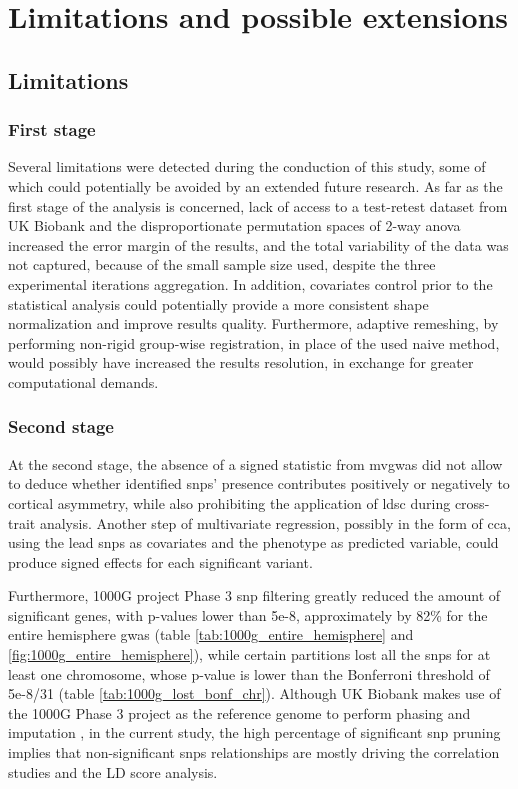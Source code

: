 \section{Limitations and possible extensions}
\subsection{Limitations}

\subsubsection{First stage}
Several limitations were detected during the conduction of this study, some of which could potentially be avoided by an extended future research. As far as the first stage of the analysis is concerned, lack of access to a test-retest dataset from UK Biobank and the disproportionate permutation spaces of 2-way \ac{anova} increased the error margin of the results, and the total variability of the data was not captured, because of the small sample size used, despite the three experimental iterations aggregation. In addition, covariates control prior to the statistical analysis could potentially provide a more consistent shape normalization and improve results quality. Furthermore, adaptive remeshing, by performing non-rigid group-wise registration, in place of the used naive method, would possibly have increased the results resolution, in exchange for greater computational demands.

\subsubsection{Second stage}
At the second stage, the absence of a signed statistic from \ac{mvgwas} did not allow to deduce whether identified \acp{snp}' presence contributes positively or negatively to cortical asymmetry, while also prohibiting the application of \ac{ldsc} during cross-trait analysis. Another step of multivariate regression, possibly in the form of \ac{cca}, using the lead \acp{snp} as covariates and the phenotype as predicted variable, could produce signed effects for each significant variant. 

Furthermore, 1000G project Phase 3 \ac{snp} filtering greatly reduced the amount of significant genes, with p-values lower than 5e-8, approximately by 82\% for the entire hemisphere \ac{gwas} (table \autoref{tab:1000g_entire_hemisphere} and \autoref{fig:1000g_entire_hemisphere}), while certain partitions lost all the \acp{snp} for at least one chromosome, whose p-value is lower than the Bonferroni threshold of 5e-8/31 (table \autoref{tab:1000g_lost_bonf_chr}). Although UK Biobank makes use of the 1000G Phase 3 project as the reference genome to perform phasing and imputation \cite{Bycroft2018}, in the current study, the high percentage of significant \ac{snp} pruning implies that non-significant \acp{snp} relationships are mostly driving the correlation studies and the LD score analysis.

